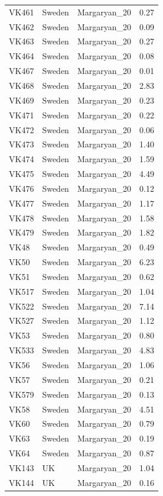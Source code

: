 \begin{longtable}[t]{lllr}
VK461 & Sweden & Margaryan\_20 & 0.27\\
VK462 & Sweden & Margaryan\_20 & 0.09\\
VK463 & Sweden & Margaryan\_20 & 0.27\\
VK464 & Sweden & Margaryan\_20 & 0.08\\
VK467 & Sweden & Margaryan\_20 & 0.01\\
VK468 & Sweden & Margaryan\_20 & 2.83\\
VK469 & Sweden & Margaryan\_20 & 0.23\\
VK471 & Sweden & Margaryan\_20 & 0.22\\
VK472 & Sweden & Margaryan\_20 & 0.06\\
VK473 & Sweden & Margaryan\_20 & 1.40\\
VK474 & Sweden & Margaryan\_20 & 1.59\\
VK475 & Sweden & Margaryan\_20 & 4.49\\
VK476 & Sweden & Margaryan\_20 & 0.12\\
VK477 & Sweden & Margaryan\_20 & 1.17\\
VK478 & Sweden & Margaryan\_20 & 1.58\\
VK479 & Sweden & Margaryan\_20 & 1.82\\
VK48 & Sweden & Margaryan\_20 & 0.49\\
VK50 & Sweden & Margaryan\_20 & 6.23\\
VK51 & Sweden & Margaryan\_20 & 0.62\\
VK517 & Sweden & Margaryan\_20 & 1.04\\
VK522 & Sweden & Margaryan\_20 & 7.14\\
VK527 & Sweden & Margaryan\_20 & 1.12\\
VK53 & Sweden & Margaryan\_20 & 0.80\\
VK533 & Sweden & Margaryan\_20 & 4.83\\
VK56 & Sweden & Margaryan\_20 & 1.06\\
VK57 & Sweden & Margaryan\_20 & 0.21\\
VK579 & Sweden & Margaryan\_20 & 0.13\\
VK58 & Sweden & Margaryan\_20 & 4.51\\
VK60 & Sweden & Margaryan\_20 & 0.79\\
VK63 & Sweden & Margaryan\_20 & 0.19\\
VK64 & Sweden & Margaryan\_20 & 0.87\\
VK143 & UK & Margaryan\_20 & 1.04\\
VK144 & UK & Margaryan\_20 & 0.16\\

\end{longtable}
